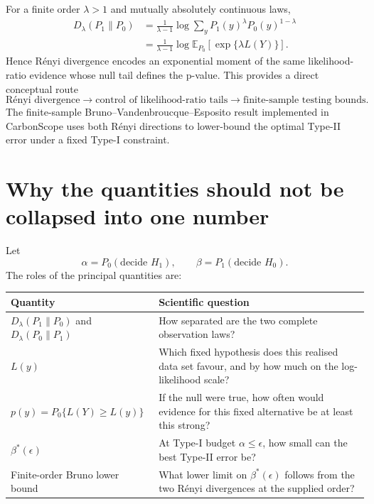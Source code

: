 \documentclass[11pt]{article}
\newcommand{\Renyi}[1]{D_{#1}}
\newcommand{\Pnull}{P_0}
\newcommand{\Palt}{P_1}
\newcommand{\E}{\mathbb{E}}
\begin{document}
For a finite order $\lambda>1$ and mutually absolutely continuous laws,
\begin{align}
\Renyi{\lambda}(\Palt\|\Pnull)
&=\frac{1}{\lambda-1}
\log\sum_y \Palt(y)^\lambda\Pnull(y)^{1-\lambda}\\
&=\frac{1}{\lambda-1}
\log\E_{\Pnull}\!\left[\exp\{\lambda L(Y)\}\right].
\end{align}
Hence Rényi divergence encodes an exponential moment of the same
likelihood-ratio evidence whose null tail defines the p-value. This provides a
direct conceptual route
\begin{equation}
\boxed{
\text{Rényi divergence}
\longrightarrow
\text{control of likelihood-ratio tails}
\longrightarrow
\text{finite-sample testing bounds}.
}
\end{equation}
The finite-sample Bruno--Vandenbroucque--Esposito result implemented in
CarbonScope uses both Rényi directions to lower-bound the optimal Type-II error
under a fixed Type-I constraint.

\section{Why the quantities should not be collapsed into one number}

Let
\begin{equation}
\alpha=P_0(\text{decide }H_1),
\qquad
\beta=P_1(\text{decide }H_0).
\end{equation}
The roles of the principal quantities are:

\begin{center}
\begin{tabular}{p{}p{}}
\toprule
Quantity & Scientific question \\
\midrule
$D_\lambda(P_1\|P_0)$ and $D_\lambda(P_0\|P_1)$
& How separated are the two complete observation laws? \\
$L(y)$
& Which fixed hypothesis does this realised data set favour, and by how much on the log-likelihood scale? \\
$p(y)=P_0\{L(Y)\ge L(y)\}$
& If the null were true, how often would evidence for this fixed alternative be at least this strong? \\
$\beta^*(\epsilon)$
& At Type-I budget $\alpha\le\epsilon$, how small can the best Type-II error be? \\
Finite-order Bruno lower bound
& What lower limit on $\beta^*(\epsilon)$ follows from the two Rényi divergences at the supplied order? \\
\bottomrule
\end{tabular}
\end{center}
\end{document}
